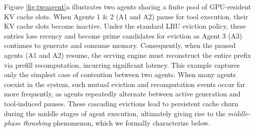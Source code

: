 Figure \ref{fig:twoagent}a
illustrates two agents sharing a finite pool of GPU-resident KV cache slots. When Agents 1 \& 2 (A1 and A2) pause for tool execution, their KV cache slots become inactive.  Under the standard LRU eviction policy, these entries lose recency and become prime candidates for eviction as Agent 3 (A3) continues to generate and consume memory. 
Consequently, when the paused agents (A1 and A2) resume, the serving engine must reconstruct the entire prefix via prefill recomputation, incurring significant latency. This example captures only the simplest case of contention between two agents.
When many agents coexist in the system, such mutual eviction and recomputation events occur far more frequently, as agents repeatedly alternate between active generation and tool-induced pauses.
These cascading evictions lead to persistent cache churn during the middle stages of agent execution, ultimately giving rise to the \emph{middle-phase thrashing} phenomenon, which we formally characterize below.







